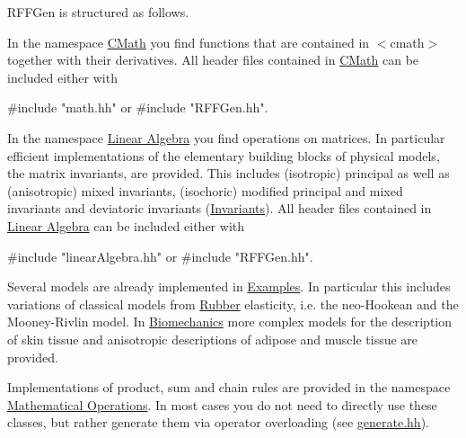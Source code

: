 R\-F\-F\-Gen is structured as follows.


\begin{DoxyItemize}
\item In the namespace \hyperlink{group__CMathGroup}{C\-Math} you find functions that are contained in {\ttfamily $<$cmath$>$} together with their derivatives. All header files contained in \hyperlink{group__CMathGroup}{C\-Math} can be included either with 
\begin{DoxyPre}{\ttfamily #include "math.hh"} or {\ttfamily #include "RFFGen.hh"}.\end{DoxyPre}

\item In the namespace \hyperlink{group__LinearAlgebraGroup}{Linear Algebra} you find operations on matrices. In particular efficient implementations of the elementary building blocks of physical models, the matrix invariants, are provided. This includes (isotropic) principal as well as (anisotropic) mixed invariants, (isochoric) modified principal and mixed invariants and deviatoric invariants (\hyperlink{group__InvariantGroup}{Invariants}). All header files contained in \hyperlink{group__LinearAlgebraGroup}{Linear Algebra} can be included either with 
\begin{DoxyPre}{\ttfamily #include "linearAlgebra.hh"} or {\ttfamily #include "RFFGen.hh"}.\end{DoxyPre}

\item Several models are already implemented in \hyperlink{group__Examples}{Examples}. In particular this includes variations of classical models from \hyperlink{group__Rubber}{Rubber} elasticity, i.\-e. the neo-\/\-Hookean and the Mooney-\/\-Rivlin model. In \hyperlink{group__Biomechanics}{Biomechanics} more complex models for the description of skin tissue and anisotropic descriptions of adipose and muscle tissue are provided.
\item Implementations of product, sum and chain rules are provided in the namespace \hyperlink{group__MathematicalOperationsGroup}{Mathematical Operations}. In most cases you do not need to directly use these classes, but rather generate them via operator overloading (see \hyperlink{generate_8hh_source}{generate.\-hh}). 
\end{DoxyItemize}